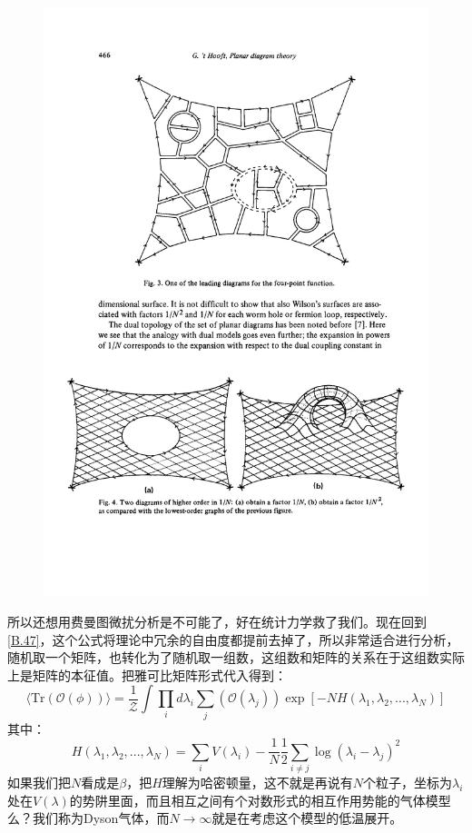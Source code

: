 \begin{figure}[H]
	\centering
	\includegraphics{figs/fig13.pdf}
\end{figure}
所以还想用费曼图微扰分析是不可能了，好在统计力学救了我们。现在回到\ref{B.47}，这个公式将理论中冗余的自由度都提前去掉了，所以非常适合进行分析，随机取一个矩阵，也转化为了随机取一组数，这组数和矩阵的关系在于这组数实际上是矩阵的本征值。把雅可比矩阵形式代入得到：
\begin{equation}\label{B.59}
	\langle\mathrm{Tr}(\mathcal{O}(\phi))\rangle=\frac1{\mathcal{Z}}\int\prod_id\lambda_i\sum_j(\mathcal{O}(\lambda_j))\exp\left[-NH(\lambda_1,\lambda_2,...,\lambda_N)\right]
\end{equation}
其中：
\begin{equation}
	H(\lambda_1,\lambda_2,...,\lambda_N)=\sum_iV(\lambda_i)-\frac{1}{N}\frac{1}{2}\sum_{i\neq j}\operatorname{log}(\lambda_i-\lambda_j)^2
\end{equation}
如果我们把$N$看成是$\beta$，把$H$理解为哈密顿量，这不就是再说有$N$个粒子，坐标为$\lambda_i$处在$V(\lambda)$的势阱里面，而且相互之间有个对数形式的相互作用势能的气体模型么？我们称为Dyson气体，而$N\to\infty$就是在考虑这个模型的低温展开。

